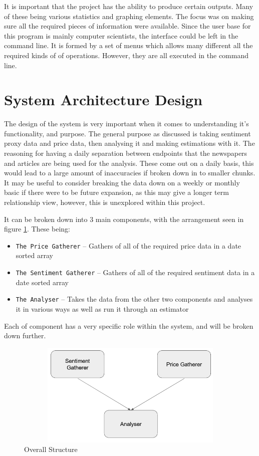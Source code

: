 It is important that the project has the ability to produce certain outputs. Many of these being various statistics and graphing elements. The focus was on making sure all the required pieces of information were available. Since the user base for this program is mainly computer scientists, the interface could be left in the command line. It is formed by a set of menus which allows many different all the required kinds of of operations. However, they are all executed in the command line.

\section{System Architecture Design}

The design of the system is very important when it comes to understanding it's functionality, and purpose. The general purpose as discussed is taking sentiment proxy data and price data, then analysing it and making estimations with it. The reasoning for having a daily separation between endpoints that the newspapers and articles are being used for the analysis. These come out on a daily basis, this would lead to a large amount of inaccuracies if broken down in to smaller chunks. It may be useful to consider breaking the data down on a weekly or monthly basic if there were to be future expansion, as this may give a longer term relationship view, however, this is unexplored within this project.

It can be broken down into 3 main components, with the arrangement seen in figure \ref{fig:overallstructure}. These being:
\begin{itemize}
    \item \texttt{The Price Gatherer} -- Gathers of all of the required price data in a date sorted array
    \item \texttt{The Sentiment Gatherer} -- Gathers of all of the required sentiment data in a date sorted array
    \item \texttt{The Analyser} -- Takes the data from the other two components and analyses it in various ways as well as run it through an estimator
\end{itemize}
Each of component has a very specific role within the system, and will be broken down further.
\begin{figure}[h]
    \centering
    \includegraphics[width=15cm,height=5cm,keepaspectratio]{design/OverallStructure.png}
    \caption{Overall Structure}
    \label{fig:overallstructure}
\end{figure}

